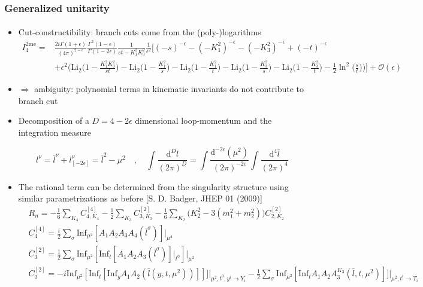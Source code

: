 \documentclass[english]{beamer}
\newcommand{\dd}{\textrm{d}}
\newcommand{\Inf}{\mathrm{Inf}}
\newcommand{\dilog}{\mathrm{Li}_2}
\begin{document}
\begin{frame}[shrink=20]
\frametitle{Generalized unitarity}
\framesubtitle{}
\begin{itemize}
\item<1-> Cut-constructibility: branch cuts come from the (poly-)logarithms
\tiny
\begin{equation*}
\begin{split}
I^{\mathrm{2me}}_4 = &\frac{2i\Gamma(1+\epsilon)}{(4\pi)^{2-\epsilon}}\frac{ \Gamma^2(1-\epsilon)}{\Gamma(1-2\epsilon)}\frac{1}{st-K_1^2K_3^2}\frac{1}{\epsilon^2}
\Big[
(-s)^{-\epsilon} - (-K_1^2)^{-\epsilon} - (-K_3^2)^{-\epsilon} + (-t)^{-\epsilon}
\\&
+\epsilon^2\Big(
\dilog\big(1-\frac{K_1^2K_3^2}{st}\big) 
-\dilog\big(1-\frac{K_1^2}{s}\big) 
-\dilog\big(1-\frac{K_1^2}{t}\big) 
-\dilog\big(1-\frac{K_3^2}{s}\big) 
-\dilog\big(1-\frac{K_3^2}{t}\big) 
-\frac{1}{2}\ln^2\big(\frac{s}{t}\big)
\Big)
\Big]
+\mathcal{O}(\epsilon)
\end{split}
\end{equation*}
\normalsize
\item<2->[]
$\Rightarrow$ ambiguity: polynomial terms in kinematic invariants do not contribute to branch cut

\item<3-> Decomposition of a $D=4-2\epsilon$ dimensional loop-momentum and the integration measure

\begin{equation*}
l^\nu = \bar{l}^\nu + l_{[-2\epsilon]}^\nu = \bar{l}^2 - \mu^2
\quad,\quad
\int\frac{\dd^D l}{(2\pi)^D} = 
\int\frac{\dd^{-2\epsilon}(\mu^2)}{(2\pi)^{-2\epsilon}}\int\frac{\dd^4 \bar{l}}{(2\pi)^4}
\end{equation*}

\item<4-> The rational term can be determined from the singularity structure using similar parametrizations as before
\tiny\color{blue}
[S. D. Badger, JHEP 01 (2009)]
\color{black}\small
\begin{equation*}
\begin{split}
& R_n = -\frac{1}{6}\sum_{K_4}C_{4,K_4}^{[4]} - \frac{1}{2}\sum_{K_3}C_{3,K_3}^{[2]} - 
\frac{1}{6}\sum_{K_2}\big(K_2^2 - 3(m_1^2 + m_2^2)\big)C_{2,K_2}^{[2]}
\\
& C_4^{[4]} = \frac{i}{2}\sum_{\sigma}\Inf_{\mu^2}[A_1A_2A_3A_4(\bar{l}^\sigma)]\big|_{\mu^4}
\\
& C_3^{[2]} = \frac{1}{2}\sum_\sigma\Inf_{\mu^2}[\Inf_t[A_1A_2A_3(\bar{l}^\sigma)]\big|_{t^0}]\big|_{\mu^2}
\\
& C_2^{[2]} = -i\Inf_{\mu^2}[\Inf_t[\Inf_y A_1 A_2(\bar{l}(y,t,\mu^2))]]]\big|_{\mu^2,t^0,y^i\rightarrow Y_i} -\frac{1}{2}\sum_{\sigma}\Inf_{\mu^2}[\Inf_tA_1A_2A_3^{K_3}(\bar{l}, t, \mu^2)]]\big|_{\mu^2,t^i\rightarrow T_i}
\end{split}
\end{equation*}

\end{itemize}

\end{frame}
\end{document}
